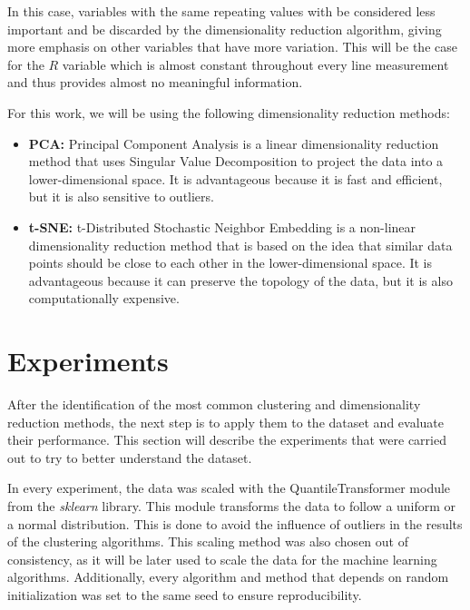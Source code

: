 In this case, variables with the same repeating values with be considered less important and be discarded by the dimensionality reduction algorithm, giving more emphasis on other variables that have more variation. This will be the case for the $R$ variable which is almost constant throughout every line measurement and thus provides almost no meaningful information.

For this work, we will be using the following dimensionality reduction methods:

\begin{itemize}
    \item \textbf{PCA:} Principal Component Analysis is a linear dimensionality reduction method that uses Singular Value Decomposition to project the data into a lower-dimensional space. It is advantageous because it is fast and efficient, but it is also sensitive to outliers.
    \item \textbf{t-SNE:} t-Distributed Stochastic Neighbor Embedding is a non-linear dimensionality reduction method that is based on the idea that similar data points should be close to each other in the lower-dimensional space. It is advantageous because it can preserve the topology of the data, but it is also computationally expensive.
\end{itemize}

\section{Experiments}\label{sec:clustering_experiments}
After the identification of the most common clustering and dimensionality reduction methods, the next step is to apply them to the dataset and evaluate their performance. This section will describe the experiments that were carried out to try to better understand the dataset. 

In every experiment, the data was scaled with the QuantileTransformer module from the \textit{sklearn} \cite{scikit-learn} library. This module transforms the data to follow a uniform or a normal distribution. This is done to avoid the influence of outliers in the results of the clustering algorithms. This scaling method was also chosen out of consistency, as it will be later used to scale the data for the machine learning algorithms. Additionally, every algorithm and method that depends on random initialization was set to the same seed to ensure reproducibility.


